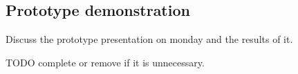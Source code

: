 \subsection{Prototype demonstration}\label{Prototype Demonstration}
    Discuss the prototype presentation on monday  and the results of it. 
    
    TODO complete or remove if it is unnecessary. 

